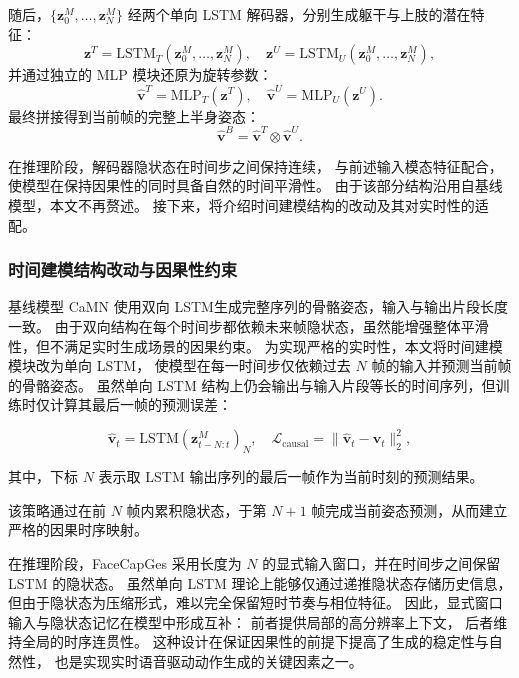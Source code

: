 随后，$\{\bm{z}_0^{M}, \ldots, \bm{z}_N^{M}\}$ 经两个单向 LSTM 解码器，分别生成躯干与上肢的潜在特征：
\begin{equation}
\bm{z}^{T} = \mathrm{LSTM}_{T}(\bm{z}_0^{M}, \ldots, \bm{z}_N^{M}), \quad
\bm{z}^{U} = \mathrm{LSTM}_{U}(\bm{z}_0^{M}, \ldots, \bm{z}_N^{M}),
\end{equation}
并通过独立的 MLP 模块还原为旋转参数：
\begin{equation}
\hat{\bm{v}}^{T} = \mathrm{MLP}_{T}(\bm{z}^{T}), \quad
\hat{\bm{v}}^{U} = \mathrm{MLP}_{U}(\bm{z}^{U}).
\end{equation}
最终拼接得到当前帧的完整上半身姿态：
\begin{equation}
\hat{\bm{v}}^{B} = \hat{\bm{v}}^{T} \otimes \hat{\bm{v}}^{U}.
\end{equation}

在推理阶段，解码器隐状态在时间步之间保持连续，
与前述输入模态特征配合，使模型在保持因果性的同时具备自然的时间平滑性。
由于该部分结构沿用自基线模型，本文不再赘述。
接下来，将介绍时间建模结构的改动及其对实时性的适配。

\subsubsection{时间建模结构改动与因果性约束}

基线模型 CaMN 使用双向 LSTM生成完整序列的骨骼姿态，输入与输出片段长度一致。
由于双向结构在每个时间步都依赖未来帧隐状态，虽然能增强整体平滑性，但不满足实时生成场景的因果约束。
为实现严格的实时性，本文将时间建模模块改为单向 LSTM，
使模型在每一时间步仅依赖过去 $N$ 帧的输入并预测当前帧的骨骼姿态。
虽然单向 LSTM 结构上仍会输出与输入片段等长的时间序列，但训练时仅计算其最后一帧的预测误差：

\begin{equation}
\hat{\bm{v}}_{t} = \mathrm{LSTM}(\bm{z}_{t-N:t}^{M})_{N}, \quad
\mathcal{L}_{\text{causal}} = \|\hat{\bm{v}}_t - \bm{v}_t\|_2^2,
\end{equation}

其中，下标 $N$ 表示取 LSTM 输出序列的最后一帧作为当前时刻的预测结果。

该策略通过在前 $N$ 帧内累积隐状态，于第 $N+1$ 帧完成当前姿态预测，从而建立严格的因果时序映射。

在推理阶段，FaceCapGes 采用长度为 $N$ 的显式输入窗口，并在时间步之间保留 LSTM 的隐状态。
虽然单向 LSTM 理论上能够仅通过递推隐状态存储历史信息，
但由于隐状态为压缩形式，难以完全保留短时节奏与相位特征。
因此，显式窗口输入与隐状态记忆在模型中形成互补：
前者提供局部的高分辨率上下文，
后者维持全局的时序连贯性。
这种设计在保证因果性的前提下提高了生成的稳定性与自然性，
也是实现实时语音驱动动作生成的关键因素之一。


